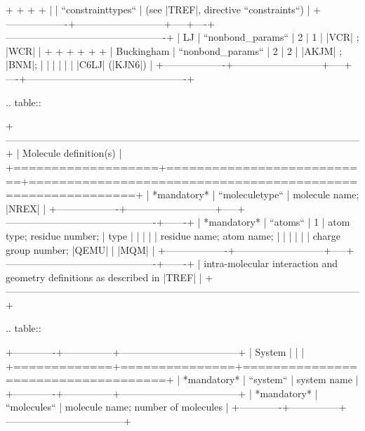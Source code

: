         +                   +                           +                                                            +
        |                   | ``constrainttypes``       |  (see |TREF|, directive ``constraints``)                   |
        +-------------------+---------------------------+-----+----+-------------------------------------------------+
        | LJ                | ``nonbond_params``        |  2  | 1  |  |VCR|  ; |WCR|                                 |
        +                   +                           +     +    +                                                 +
        | Buckingham        | ``nonbond_params``        |  2  | 2  |  |AKJM| ; |BNM|;                                |
        |                   |                           |     |    |  |C6LJ| (|KJN6|)                                |
        +-------------------+---------------------------+-----+----+-------------------------------------------------+

.. table:: 

        +------------------------------------------------------------------------------------------------------------+
        | Molecule definition(s)                                                                                     |
        +===================+===========================+============================================================+
        | *mandatory*       | ``moleculetype``          | molecule name; |NREX|                                      |
        +-------------------+---------------------------+-----+----------------------------------------------+-------+
        | *mandatory*       | ``atoms``                 | 1   | atom type; residue number;                   | type  |
        |                   |                           |     | residue name; atom name;                     |       |
        |                   |                           |     | charge group number; |QEMU|                  | |MQM| |
        +-------------------+---------------------------+-----+----------------------------------------------+-------+
        | intra-molecular interaction and geometry definitions as described in |TREF|                                |
        +------------------------------------------------------------------------------------------------------------+

.. table::

        +-------------+---------------+------------------------------------+
        | System      |               |                                    |
        +=============+===============+====================================+
        | *mandatory* | ``system``    | system name                        |
        +-------------+---------------+------------------------------------+
        | *mandatory* | ``molecules`` | molecule name; number of molecules |
        +-------------+---------------+------------------------------------+

